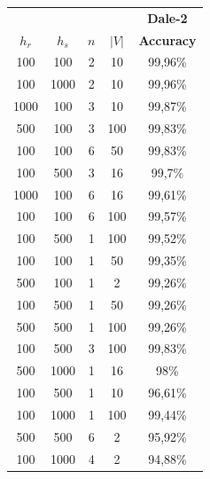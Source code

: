 \begin{table}[ht]
    \centering
    \begin{tabular}{cccc|c}
        \toprule
               &        &     &       & \multicolumn{1}{c}{\textbf{Dale-2}} \\  \cmidrule(lr){5-5}
        $h_r$  & $h_s$  & $n$ & $|V|$ & \textbf{Accuracy}                   \\\midrule
        {100}  & {100}  & {2} & {10}  & {99,96\%}                           \\
        {100}  & {1000} & {2} & {10}  & {99,96\%}                           \\
        {1000} & {100}  & {3} & {10}  & {99,87\%}                           \\
        {500}  & {100}  & {3} & {100} & {99,83\%}                           \\
        {100}  & {100}  & {6} & {50}  & {99,83\%}                           \\
        {100}  & {500}  & {3} & {16}  & {99,7\%}                            \\
        {1000} & {100}  & {6} & {16}  & {99,61\%}                           \\
        {100}  & {100}  & {6} & {100} & {99,57\%}                           \\
        {100}  & {500}  & {1} & {100} & {99,52\%}                           \\
        {100}  & {100}  & {1} & {50}  & {99,35\%}                           \\
        {500}  & {100}  & {1} & {2}   & {99,26\%}                           \\
        {100}  & {500}  & {1} & {50}  & {99,26\%}                           \\
        {500}  & {500}  & {1} & {100} & {99,26\%}                           \\
        {100}  & {500}  & {3} & {100} & {99,83\%}                           \\
        {500}  & {1000} & {1} & {16}  & {98\%}                              \\
        {100}  & {500}  & {1} & {10}  & {96,61\%}                           \\
        {100}  & {1000} & {1} & {100} & {99,44\%}                           \\
        {500}  & {500}  & {6} & {2}   & {95,92\%}                           \\
        {100}  & {1000} & {4} & {2}   & {94,88\%}                           \\

\end{tabular}
\end{table}
